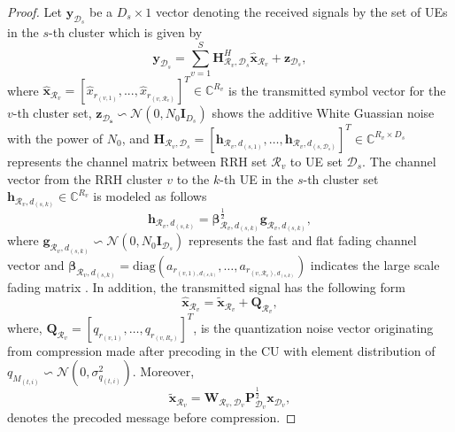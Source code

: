 \documentclass[journal,onecolumn,11pt,draftcls,doublespace]{IEEEtran}
\begin{document}
\begin{proof}
Let $\boldsymbol{y}_{\mathcal{D}_s}$ be a $D_s \times 1$ vector denoting the received signals by the set of UEs in the $s$-th cluster which is given by
\begin{equation} \label{1}
\boldsymbol{y}_{\mathcal{D}_s} = \sum_{v=1}^S \boldsymbol{H}^H_{\mathcal{R}_v,\mathcal{D}_s}\hat{\boldsymbol{x}}_{\mathcal{R}_v}+ \boldsymbol{z}_{\mathcal{D}_s},
\end{equation}
where $\hat{\boldsymbol{x}}_{ \mathcal{R}_v} = [\hat{x}_{ r_{(v,1)}},...,\hat{ x}_{ r_{(v,\mathcal{R}_v)}}]^T \in \mathbb{C}^{{R}_v } $ is the transmitted symbol vector for the $v$-th cluster set, $\boldsymbol{z_{\mathcal{D}_s}} \backsim \mathcal{N}(0,N_0\boldsymbol{I}_{{D}_s})$ shows the additive White Guassian noise with the power of $N_0$, and $\boldsymbol{H}_{\mathcal{R}_v,\mathcal{D}_s}=\left[\boldsymbol{h}_{\mathcal{R}_v,d_{(s,1)}},\ldots,\boldsymbol{h}_{\mathcal{R}_v,d_{(s,\mathcal{D}_s)}}\right]^T  \in \mathbb{C}^{{R}_v\times {D}_s}$ 
represents the channel matrix between RRH set $\mathcal{R}_v$ to UE set
$\mathcal{D}_s$. The channel vector from the RRH cluster $v$ to the $k$-th UE in the $s$-th cluster set $\boldsymbol{h}_{\mathcal{R}_v,d_{(s,k)}}\in \mathbb{C}^{{R}_v}$ is modeled as follows
\begin{equation}
\boldsymbol{h}_{\mathcal{R}_v,d_{(s,k)}} = \boldsymbol{\beta}^\frac{1}{2}_{\mathcal{R}_v,d_{(s,k)}} \boldsymbol{g}_{\mathcal{R}_v,d_{(s,k)}},
\end{equation}
where $\boldsymbol{g}_{\mathcal{R}_v,d_{(s,k)}} \backsim \mathcal{N}(0,N_0\boldsymbol{I}_{\mathcal{D}_s})$ represents the fast and flat fading channel vector and $\boldsymbol{\beta}_{\mathcal{R}_v,d_{(s,k)}}=\text{diag}(a_{r_{(v,1),d_{(s,k)}}},\ldots,a_{r_{(v,\mathcal{R}_v),d_{(s,k)}}})$
indicates the large scale fading matrix \cite{88}. In addition, the transmitted signal has the following form
\begin{equation}
\label{eq_pow1}
 \hat{\boldsymbol{x}}_{\mathcal{R}_v} = \tilde{\boldsymbol{x}}_{\mathcal{R}_v} + \boldsymbol{Q}_{\mathcal{R}_v},
\end{equation}
where, $\boldsymbol{Q}_{\mathcal{R}_v} = \left[ q_{r_{(v,1)}},\ldots,q_{r_{(v,R_v)}}\right]^T$,  is the quantization noise vector originating from compression made after precoding in the CU with element distribution of
$q_{M_{(t,i)}}\backsim \mathcal{N}(0,\sigma_{q_{(t,i)}}^2) $. Moreover,
$$\tilde{\boldsymbol{x}}_{\mathcal{R}_v} = \textbf{W}_{\mathcal{R}_v,\mathcal{D}_v} \textbf{P}_{\mathcal{D}_v}^{\frac{1}{2}} \boldsymbol{x}_{ \mathcal{D}_v},$$
denotes the precoded message before compression.



\end{proof}
\end{document}
